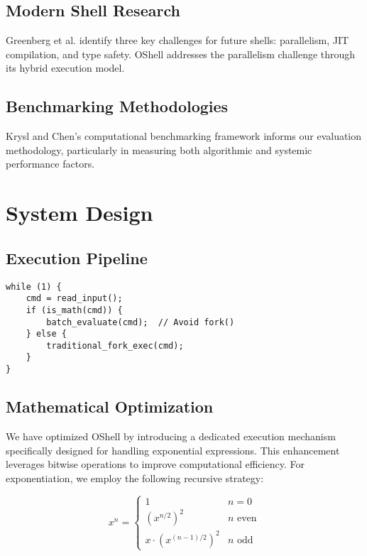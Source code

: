 \documentclass[10pt,twocolumn]{article}
\begin{document}
\subsection{Modern Shell Research}
Greenberg et al. \cite{modernshell} identify three key challenges for future shells: parallelism, JIT compilation, and type safety. OShell addresses the parallelism challenge through its hybrid execution model.

\subsection{Benchmarking Methodologies}
Krysl and Chen's computational benchmarking framework \cite{bench} informs our evaluation methodology, particularly in measuring both algorithmic and systemic performance factors.

\section{System Design}

\subsection{Execution Pipeline}
\begin{lstlisting}[caption={Hybrid Execution Algorithm},xleftmargin=2em]
while (1) {
    cmd = read_input();
    if (is_math(cmd)) {
        batch_evaluate(cmd);  // Avoid fork()
    } else {
        traditional_fork_exec(cmd);
    }
}
\end{lstlisting}

\subsection{Mathematical Optimization}
We have optimized OShell by introducing a dedicated execution mechanism specifically designed for handling exponential expressions. This enhancement leverages bitwise operations to improve computational efficiency.
For exponentiation, we employ the following recursive strategy:

\begin{equation}
x^n = \begin{cases} 
1 & n = 0 \\
(x^{n/2})^2 & n \text{ even} \\
x \cdot (x^{(n-1)/2})^2 & n \text{ odd}
\end{cases}
\end{equation}
\end{document}
